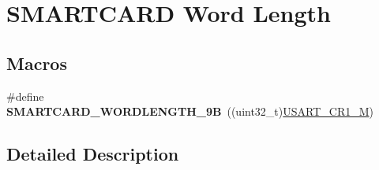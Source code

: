 \hypertarget{group___s_m_a_r_t_c_a_r_d___word___length}{}\section{S\+M\+A\+R\+T\+C\+A\+RD Word Length}
\label{group___s_m_a_r_t_c_a_r_d___word___length}
\subsection*{Macros}
\begin{DoxyCompactItemize}
\item 
\#define {\bfseries S\+M\+A\+R\+T\+C\+A\+R\+D\+\_\+\+W\+O\+R\+D\+L\+E\+N\+G\+T\+H\+\_\+9B}~((uint32\+\_\+t)\hyperlink{group___peripheral___registers___bits___definition_ga95f0288b9c6aaeca7cb6550a2e6833e2}{U\+S\+A\+R\+T\+\_\+\+C\+R1\+\_\+M})\hypertarget{group___s_m_a_r_t_c_a_r_d___word___length_ga22f73d114cf13ee0041537303faef14b}{}\label{group___s_m_a_r_t_c_a_r_d___word___length_ga22f73d114cf13ee0041537303faef14b}

\end{DoxyCompactItemize}


\subsection{Detailed Description}
